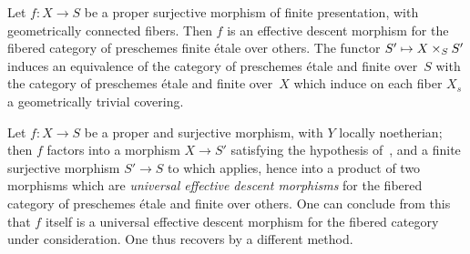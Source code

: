 \begin{corollary}
\label{IX.6.8}
Let $f\colon X\to S$ be a proper surjective morphism of finite
presentation, with geometrically connected fibers. Then $f$ is an
effective descent morphism for the fibered category of preschemes
finite étale over others. The functor $S'\mto X\times_S S'$ induces an
equivalence of the category of preschemes étale and finite over~$S$
with the category of preschemes
étale and finite over~$X$ which induce on each fiber $X_s$ a
geometrically trivial covering.
\end{corollary}

\begin{remark}
\label{IX.6.9}
Let $f\colon X\to S$ be a proper and surjective morphism, with $Y$
locally noetherian; then $f$ factors into a morphism $X\to S'$
satisfying the hypothesis of~, and a finite surjective
morphism $S'\to S$ to which  applies, hence into a product
of two morphisms which are \emph{universal effective descent
morphisms} for the fibered category of preschemes étale and finite
over others. One can conclude from this that $f$ itself is a universal
effective descent morphism for the fibered category under
consideration. One thus recovers  by a different method.
\end{remark}

